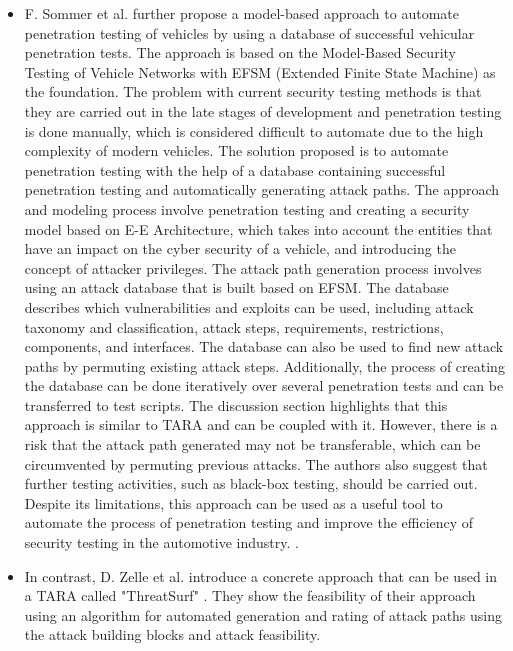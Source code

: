 \begin{itemize}
\item F. Sommer et al. further propose a model-based approach to automate penetration testing of vehicles by using a database of successful vehicular penetration tests. 
The approach is based on the Model-Based Security Testing of Vehicle Networks with EFSM (Extended Finite State Machine) as the foundation. 
The problem with current security testing methods is that they are carried out in the late stages of development and penetration testing is done manually, 
which is considered difficult to automate due to the high complexity of modern vehicles.
The solution proposed is to automate penetration testing with the help of a database containing successful penetration testing and automatically generating attack paths.
The approach and modeling process involve penetration testing and creating a security model based on E-E Architecture, which takes into account the entities that have an impact on the cyber security of a vehicle, and introducing the concept of attacker privileges.
The attack path generation process involves using an attack database that is built based on EFSM. 
The database describes which vulnerabilities and exploits can be used, including attack taxonomy and classification, attack steps, requirements, restrictions, components, and interfaces. 
The database can also be used to find new attack paths by permuting existing attack steps. 
Additionally, the process of creating the database can be done iteratively over several penetration tests and can be transferred to test scripts.
The discussion section highlights that this approach is similar to TARA and can be coupled with it. 
However, there is a risk that the attack path generated may not be transferable, which can be circumvented by permuting previous attacks. 
The authors also suggest that further testing activities, such as black-box testing, should be carried out. 
Despite its limitations, this approach can be used as a useful tool to automate the process of penetration testing and improve the efficiency of security testing in the automotive industry. \cite{attack_database}.

\item In contrast, D. Zelle et al. introduce a concrete approach that can be used in a TARA called "ThreatSurf" \cite{threat_surf}.
They show the feasibility of their approach using an algorithm for automated generation and rating of attack paths using the attack building blocks and attack feasibility.

\end{itemize}



